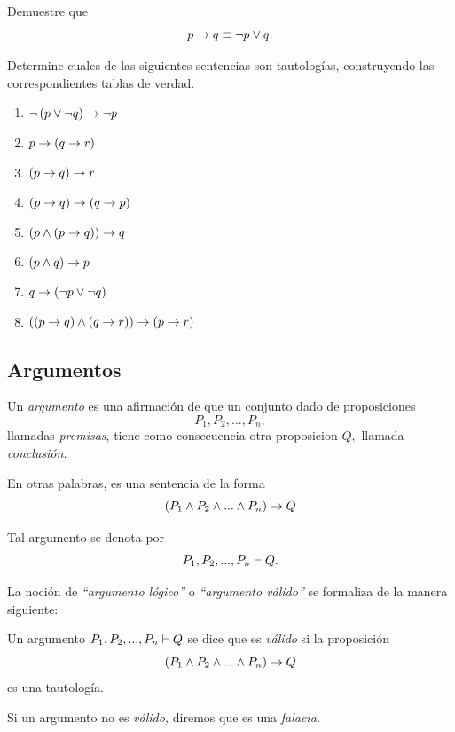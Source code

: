  \begin{exmp}
  Demuestre que $$p\rightarrow q \equiv \neg p \vee q.$$
 \end{exmp}




 \begin{exmp} Determine cuales de las siguientes sentencias son tautolog\'ias, construyendo las correspondientes tablas de verdad.
  \begin{enumerate}
   \item $\neg\left( p \vee \neg q \right) \rightarrow \neg p$
   \item $p \rightarrow \left( q\rightarrow r \right)$
   \item $\left( p \rightarrow q \right)\rightarrow r$
   \item $\left( p\rightarrow q \right) \rightarrow \left( q\rightarrow p \right)$
   \item $\left( p \wedge \left( p \rightarrow q \right) \right) \rightarrow q$
   \item $\left( p \wedge q \right) \rightarrow p$
   \item $q \rightarrow \left( \neg p \vee \neg q \right)$
   \item $\left( \left( p\rightarrow q \right) \wedge \left( q \rightarrow r \right) \right) \rightarrow \left( p \rightarrow r \right)$
  \end{enumerate}

 \end{exmp}



\subsection{Argumentos}


 Un \emph{argumento} es una afirmaci\'on de que un conjunto dado de proposiciones $$P_{1}, P_{2},...,P_{n},$$ llamadas \emph{premisas}, tiene como consecuencia otra proposicion $Q,$ llamada \emph{conclusi\'on.}
 
 En otras palabras, es una sentencia de la forma
 $$
  \left( P_{1} \wedge P_{2} \wedge...\wedge P_{n}\right) \rightarrow Q
  $$
 
 
 
 Tal argumento se denota por $$P_{1}, P_{2},...,P_{n} \vdash Q.$$



 La noci\'on de \emph{``argumento l\'ogico''} o \emph{``argumento v\'alido''} se formaliza de la manera siguiente:
 
 
 \begin{defn}
  \label{lip:4.4}
  Un argumento $P_{1}, P_{2},...,P_{n} \vdash Q$ se dice que es \emph{v\'alido} si la proposici\'on 
  $$
  \left( P_{1} \wedge P_{2} \wedge...\wedge P_{n}\right) \rightarrow Q
  $$ es una tautolog\'ia.
  
   Si un argumento no es \emph{v\'alido,} diremos que es una \emph{falacia.}
 \end{defn}





